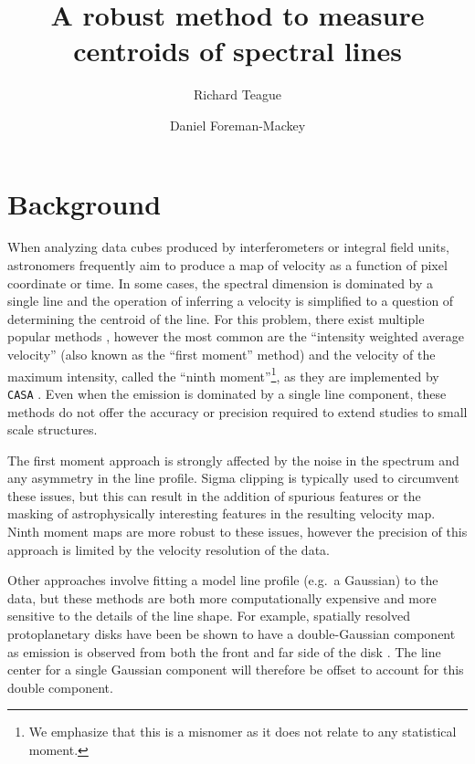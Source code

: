 \documentclass[rnaas]{aastex62}
\begin{document}
\raggedbottom\sloppy\sloppypar\frenchspacing

\title{%
A robust method to measure centroids of spectral lines
}

\author[0000-0003-1534-5186]{Richard Teague}

\author[0000-0002-9328-5652]{Daniel Foreman-Mackey}


\section{Background}

When analyzing data cubes produced by interferometers or integral field units,
astronomers frequently aim to produce a map of velocity as a function of pixel
coordinate or time.
In some cases, the spectral dimension is dominated by a single line and the
operation of inferring a velocity is simplified to a question of determining
the centroid of the line.
For this problem, there exist multiple popular methods \citep[see, for
example][]{deBlok:2008}, however the most common are the ``intensity weighted
average velocity'' (also known as the ``first moment'' method) and the
velocity of the maximum intensity, called the ``ninth moment''\footnote{We
emphasize that this is a misnomer as it does not relate to any statistical
moment.}, as they are implemented by \texttt{CASA} \citep{McMullin:2007}.
Even when the emission is dominated by a single line component, these methods
do not offer the accuracy or precision required to extend studies to small
scale structures.

The first moment approach is strongly affected by the noise in the spectrum and any asymmetry in the line profile.
Sigma clipping is typically used to circumvent these issues, but this can
result in the addition of spurious features or the masking of astrophysically
interesting features in the resulting velocity map.
Ninth moment maps are more robust to these issues, however the precision of
this approach is limited by the velocity resolution of the data.

Other approaches involve fitting a model line profile (e.g.~a Gaussian) to the
data, but these methods are both more computationally expensive and more
sensitive to the details of the line shape.
For example, spatially resolved protoplanetary disks have been be shown to
have a double-Gaussian component as emission is observed from both the front
and far side of the disk \citep{Rosenfeld:2013}.
The line center for a single Gaussian component will therefore be offset to
account for this double component.
\end{document}
